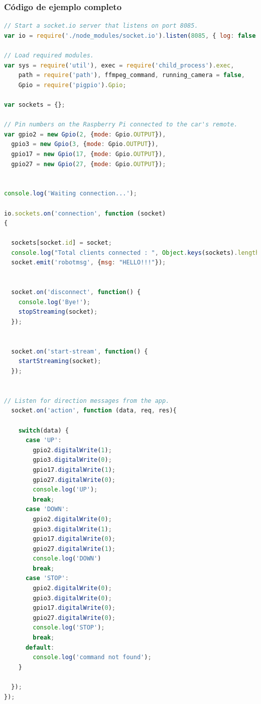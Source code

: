 \subsubsection{Código de ejemplo completo}

\begin{lstlisting}[language=JavaScript]
 // Start a socket.io server that listens on port 8085.
var io = require('./node_modules/socket.io').listen(8085, { log: false });

// Load required modules.
var sys = require('util'), exec = require('child_process').exec,
    path = require('path'), ffmpeg_command, running_camera = false,
    Gpio = require('pigpio').Gpio;

var sockets = {};

// Pin numbers on the Raspberry Pi connected to the car's remote.
var gpio2 = new Gpio(2, {mode: Gpio.OUTPUT}),
  gpio3 = new Gpio(3, {mode: Gpio.OUTPUT}),
  gpio17 = new Gpio(17, {mode: Gpio.OUTPUT}),
  gpio27 = new Gpio(27, {mode: Gpio.OUTPUT});


console.log('Waiting connection...');

io.sockets.on('connection', function (socket)
{

  sockets[socket.id] = socket;
  console.log("Total clients connected : ", Object.keys(sockets).length);
  socket.emit('robotmsg', {msg: "HELLO!!!"});


  socket.on('disconnect', function() {
    console.log('Bye!');
    stopStreaming(socket);
  });


  socket.on('start-stream', function() {
    startStreaming(socket);
  });


// Listen for direction messages from the app.
  socket.on('action', function (data, req, res){

    switch(data) {
      case 'UP':
        gpio2.digitalWrite(1);
        gpio3.digitalWrite(0);
        gpio17.digitalWrite(1);
        gpio27.digitalWrite(0);
        console.log('UP');
        break;
      case 'DOWN':
        gpio2.digitalWrite(0);
        gpio3.digitalWrite(1);
        gpio17.digitalWrite(0);
        gpio27.digitalWrite(1);
        console.log('DOWN')
        break;
      case 'STOP':
        gpio2.digitalWrite(0);
        gpio3.digitalWrite(0);
        gpio17.digitalWrite(0);
        gpio27.digitalWrite(0);
        console.log('STOP');
        break;
      default:
        console.log('command not found');
    }

  });
});





\end{lstlisting}
